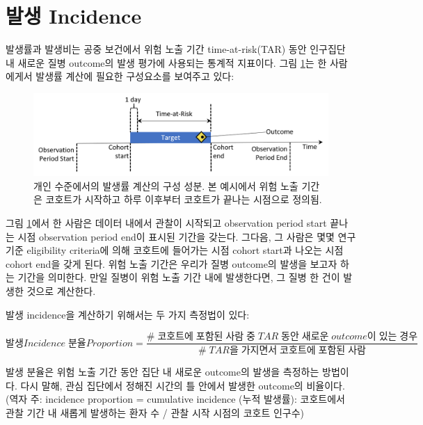 \documentclass[10.5pt]{book}
\theoremstyle{definition}
\theoremstyle{definition}
\theoremstyle{definition}
\theoremstyle{remark}
\begin{document}
\section{발생 Incidence}\label{-incidence}

발생률과 발생비는 공중 보건에서 위험 노출 기간 time-at-risk(TAR) 동안
인구집단 내 새로운 질병 outcome의 발생 평가에 사용되는 통계적 지표이다.
그림 \ref{fig:incidenceTimeline}는 한 사람에게서 발생률 계산에 필요한
구성요소를 보여주고 있다: 

\begin{figure}

{\centering \includegraphics[width=1\linewidth]{images/Characterization/incidenceTimeline} 

}

\caption{개인 수준에서의 발생률 계산의 구성 성분. 본 예시에서 위험 노출 기간은 코호트가 시작하고 하루 이후부터 코호트가 끝나는 시점으로 정의됨.}\label{fig:incidenceTimeline}
\end{figure}

그림 \ref{fig:incidenceTimeline}에서 한 사람은 데이터 내에서 관찰이
시작되고 observation period start 끝나는 시점 observation period end이
표시된 기간을 갖는다. 그다음, 그 사람은 몇몇 연구 기준 eligibility
criteria에 의해 코호트에 들어가는 시점 cohort start과 나오는 시점 cohort
end을 갖게 된다. 위험 노출 기간은 우리가 질병 outcome의 발생을 보고자
하는 기간을 의미한다. 만일 질병이 위험 노출 기간 내에 발생한다면, 그
질병 한 건이 발생한 것으로 계산한다.

발생 incidence을 계산하기 위해서는 두 가지 측정법이 있다:

\[ 
발생 Incidence\;분율 Proportion= \frac{\#\;코호트에\;포함된\;사람\;중\;TAR\;동안\;새로운\;outcome이\;있는\;경우}{\#\;TAR을\;가지면서\;코호트에\;포함된\;사람}
\]

발생 분율은 위험 노출 기간 동안 집단 내 새로운 outcome의 발생을 측정하는
방법이다. 다시 말해, 관심 집단에서 정해진 시간의 틀 안에서 발생한
outcome의 비율이다.  (역자 주: incidence
proportion = cumulative incidence (누적 발생률): 코호트에서 관찰 기간 내
새롭게 발생하는 환자 수 / 관찰 시작 시점의 코호트 인구수)
\end{document}
